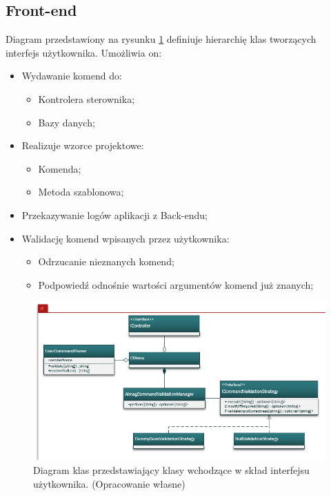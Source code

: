\subsection{Front-end}
Diagram przedstawiony na rysunku \ref{fig:DiagramKlas_UI} definiuje hierarchię klas tworzących interfejs użytkownika.
Umożliwia on:
\begin{itemize}
	\item Wydawanie komend do:
	\begin{itemize}
		\item Kontrolera sterownika;
		\item Bazy danych;
	\end{itemize}
	\item Realizuje wzorce projektowe:
	\begin{itemize}
		\item Komenda;
		\item Metoda szablonowa;
	\end{itemize}
	\item Przekazywanie logów aplikacji z Back-endu;
	\item Walidację komend wpisanych przez użytkownika:
	\begin{itemize}
		\item Odrzucanie nieznanych komend;
		\item Podpowiedź odnośnie wartości argumentów komend już znanych;
	\end{itemize}
\end{itemize}

\begin{figure}[h!]
    \centering
    \includegraphics[scale=0.75]{Obrazki/DiagramyKlas/UI.png}
    \caption{Diagram klas przedstawiający klasy wchodzące w skład interfejsu użytkownika.
        \newline(Opracowanie własne)}
	\label{fig:DiagramKlas_UI}
\end{figure}

